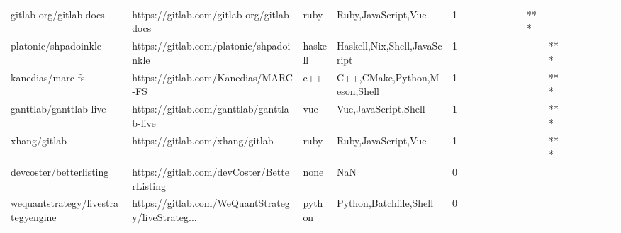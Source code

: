 \begin{tabular}{llllrlllllllllllll}
gitlab-org/gitlab-docs                             &          https://gitlab.com/gitlab-org/gitlab-docs &              ruby &                                Ruby,JavaScript,Vue &       1 &         &        &           &                &                 &        &       *** &           &          &          &       &              &          \\
platonic/shpadoinkle                               &            https://gitlab.com/platonic/shpadoinkle &           haskell &                       Haskell,Nix,Shell,JavaScript &       1 &         &        &           &                &                 &        &           &       *** &          &          &       &              &          \\
kanedias/marc-fs                                   &                https://gitlab.com/Kanedias/MARC-FS &               c++ &                       C++,CMake,Python,Meson,Shell &       1 &         &        &           &                &                 &        &           &       *** &          &          &       &              &          \\
ganttlab/ganttlab-live                             &          https://gitlab.com/ganttlab/ganttlab-live &               vue &                               Vue,JavaScript,Shell &       1 &         &        &           &                &                 &        &           &       *** &          &          &       &              &          \\
xhang/gitlab                                       &                    https://gitlab.com/xhang/gitlab &              ruby &                                Ruby,JavaScript,Vue &       1 &         &        &           &                &                 &        &           &       *** &          &          &       &              &          \\
devcoster/betterlisting                            &         https://gitlab.com/devCoster/BetterListing &              none &                                                NaN &       0 &         &        &           &                &                 &        &           &           &          &          &       &              &          \\
wequantstrategy/livestrategyengine                 &  https://gitlab.com/WeQuantStrategy/liveStrateg... &            python &                             Python,Batchfile,Shell &       0 &         &        &           &                &                 &        &           &           &          &          &       &              &          \\

\end{tabular}
